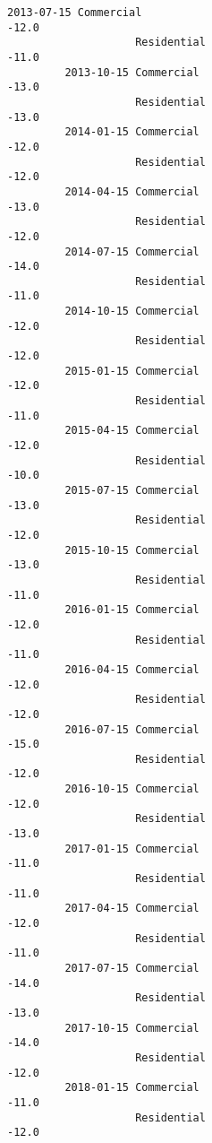 \documentclass[11pt]{article}
\begin{document}
\begin{Verbatim}[commandchars=\\\{\}]
         2013-07-15 Commercial                                             -12.0   
                    Residential                                            -11.0   
         2013-10-15 Commercial                                             -13.0   
                    Residential                                            -13.0   
         2014-01-15 Commercial                                             -12.0   
                    Residential                                            -12.0   
         2014-04-15 Commercial                                             -13.0   
                    Residential                                            -12.0   
         2014-07-15 Commercial                                             -14.0   
                    Residential                                            -11.0   
         2014-10-15 Commercial                                             -12.0   
                    Residential                                            -12.0   
         2015-01-15 Commercial                                             -12.0   
                    Residential                                            -11.0   
         2015-04-15 Commercial                                             -12.0   
                    Residential                                            -10.0   
         2015-07-15 Commercial                                             -13.0   
                    Residential                                            -12.0   
         2015-10-15 Commercial                                             -13.0   
                    Residential                                            -11.0   
         2016-01-15 Commercial                                             -12.0   
                    Residential                                            -11.0   
         2016-04-15 Commercial                                             -12.0   
                    Residential                                            -12.0   
         2016-07-15 Commercial                                             -15.0   
                    Residential                                            -12.0   
         2016-10-15 Commercial                                             -12.0   
                    Residential                                            -13.0   
         2017-01-15 Commercial                                             -11.0   
                    Residential                                            -11.0   
         2017-04-15 Commercial                                             -12.0   
                    Residential                                            -11.0   
         2017-07-15 Commercial                                             -14.0   
                    Residential                                            -13.0   
         2017-10-15 Commercial                                             -14.0   
                    Residential                                            -12.0   
         2018-01-15 Commercial                                             -11.0   
                    Residential                                            -12.0   
         

\end{Verbatim}
\end{document}
